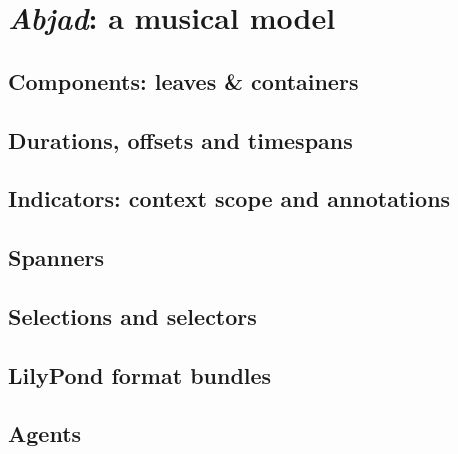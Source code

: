 \chapter{\emph{Abjad}: a musical model}

\section{Components: leaves \& containers}

\section{Durations, offsets and timespans}

\section{Indicators: context scope and annotations}

\section{Spanners}

\section{Selections and selectors}

\section{LilyPond format bundles}

\section{Agents}